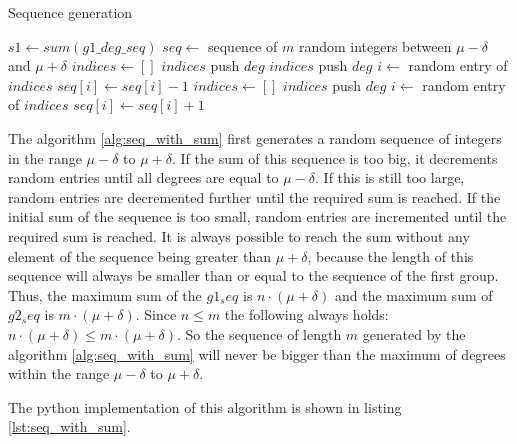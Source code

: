 \begin{algorithm}
\caption{Sequence generation}
\label{alg:seq_with_sum}
\begin{algorithmic}
\State $s1 \gets sum(g1\_deg\_seq)$
\State $seq \gets $ sequence of $m$ random integers between $\mu - \delta$ and $\mu + \delta$
        \State $indices \gets []$
                \State $indices$ push $deg$
            \EndIf
        \EndFor
                \State $indices$ push $deg$
            \EndIf
            \EndFor
        \EndIf
        \State $i \gets $ random entry of $indices$
        \State $seq[i] \gets seq[i] - 1$
    \Else
        \State $indices \gets []$
                \State $indices$ push $deg$
            \EndIf
        \EndFor
        \State $i \gets $ random entry of $indices$
        \State $seq[i] \gets seq[i] + 1$
    \EndIf
\EndWhile
\end{algorithmic}
\end{algorithm}

The algorithm \ref{alg:seq_with_sum} first generates a random sequence of integers in the range $\mu - \delta$ to $\mu + \delta$. If the sum of this sequence is too big, it decrements random entries until all degrees are equal to $\mu - \delta$. If this is still too large, random entries are decremented further until the required sum is reached. If the initial sum of the sequence is too small, random entries are incremented until the required sum is reached. It is always possible to reach the sum without any element of the sequence being greater than $\mu + \delta$, because the length of this sequence will always be smaller than or equal to the sequence of the first group. Thus, the maximum sum of the $g1_seq$ is $n \cdot (\mu + \delta)$ and the maximum sum of $g2_seq$ is $m \cdot (\mu + \delta)$. Since $n \leq m$ the following always holds: $n \cdot (\mu + \delta) \leq m \cdot (\mu + \delta)$. So the sequence of length $m$ generated by the algorithm \ref{alg:seq_with_sum} will never be bigger than the maximum of degrees within the range $\mu - \delta$ to $\mu + \delta$.

The python implementation of this algorithm is shown in listing \ref{lst:seq_with_sum}.


